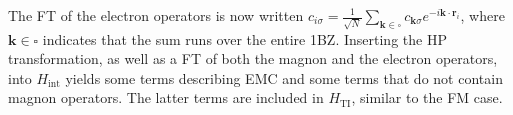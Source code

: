 \documentclass[aps, prb, twocolumn,amsmath,amssymb,floatfix]{revtex4-2}
\begin{document}

The FT of the electron operators is now written $c_{i\sigma} = \frac{1}{\sqrt{N}}\sum_{\boldsymbol{k}\in \square} c_{\boldsymbol{k}\sigma}e^{-i\boldsymbol{k}\cdot \boldsymbol{r}_i}$, where $\boldsymbol{k}\in \square$ indicates that the sum runs over the entire 1BZ. Inserting the HP transformation, as well as a FT of both the magnon and the electron operators, into $H_{\textrm{int}}$ yields some terms describing EMC and some terms that do not contain magnon operators. The latter terms are included in $H_{\textrm{TI}}$, similar to the FM case.
\end{document}
